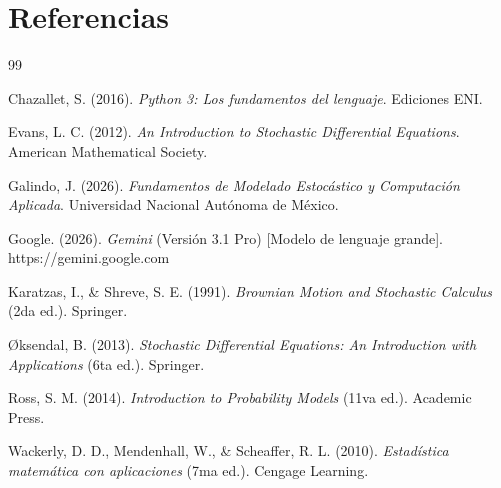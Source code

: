 \documentclass[11pt, letterpaper]{article}
\begin{document}
\newpage

\section{Referencias}


\begin{thebibliography}{99}

Chazallet, S. (2016). \textit{Python 3: Los fundamentos del lenguaje}. Ediciones ENI.

Evans, L. C. (2012). \textit{An Introduction to Stochastic Differential Equations}. American Mathematical Society.

Galindo, J. (2026). \textit{Fundamentos de Modelado Estocástico y Computación Aplicada}. Universidad Nacional Autónoma de México.

Google. (2026). \textit{Gemini} (Versión 3.1 Pro) [Modelo de lenguaje grande]. https://gemini.google.com

Karatzas, I., \& Shreve, S. E. (1991). \textit{Brownian Motion and Stochastic Calculus} (2da ed.). Springer.

{\O}ksendal, B. (2013). \textit{Stochastic Differential Equations: An Introduction with Applications} (6ta ed.). Springer.

Ross, S. M. (2014). \textit{Introduction to Probability Models} (11va ed.). Academic Press.

Wackerly, D. D., Mendenhall, W., \& Scheaffer, R. L. (2010). \textit{Estadística matemática con aplicaciones} (7ma ed.). Cengage Learning.

\end{thebibliography}
\end{document}
